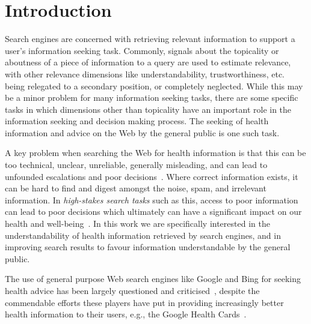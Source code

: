 \section{Introduction}
\label{chp:understanding_understandability}

Search engines are concerned with retrieving relevant information to support a user's information seeking task. Commonly, signals about the topicality or aboutness of a piece of information to a query are used to estimate relevance, with other relevance dimensions like understandability, trustworthiness, etc.~\cite{zhang2014multidimensional} being relegated to a secondary position, or completely neglected. While this may be a minor problem for many information seeking tasks, there are some specific tasks in which dimensions other than topicality have an important role in the information seeking and decision making process. The seeking of health information and advice on the Web by the general public is one such task. 

A key problem when searching the Web for health information is that this can be too technical, unclear, unreliable, generally misleading, and can lead to unfounded escalations and poor decisions~\cite{white09b}. Where correct information exists, it can be hard to find and digest amongst the noise, spam, and irrelevant information. In \textit{high-stakes search tasks} such as this, access to poor information can lead to poor decisions which ultimately can have a significant impact on our health and well-being~\cite{white09b,white13}. In this work we are specifically interested in the understandability of health information retrieved by search engines, and in improving search results to favour information understandable by the general public. 

The use of general purpose Web search engines like Google and Bing for seeking health advice has been largely questioned and criticised~\cite{graber99readability,fitzsimmons2010readability,wiener2013readability,patel13readability,atcherson14readability,meillier17readability,ellimoottil2012readability}, despite the commendable efforts these players have put in providing increasingly better health information to their users, e.g., the Google Health Cards~\cite{gabrilovich2016cura}. 

